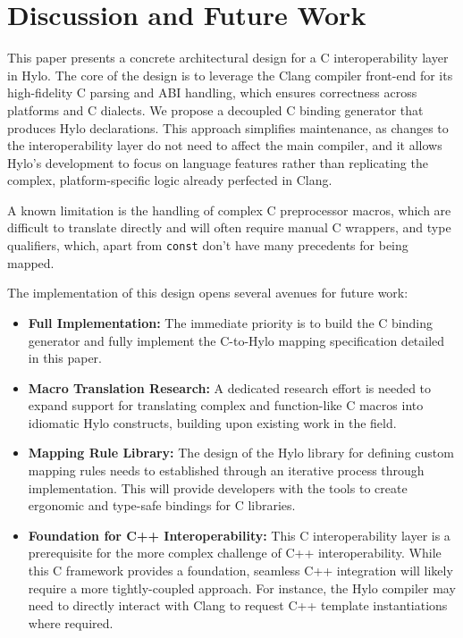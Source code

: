 \section{Discussion and Future Work}
\label{sec:discussion}

This paper presents a concrete architectural design for a C interoperability layer in Hylo. The core of the design is to leverage the Clang compiler front-end for its high-fidelity C parsing and ABI handling, which ensures correctness across platforms and C dialects. We propose a decoupled C binding generator that produces Hylo declarations. This approach simplifies maintenance, as changes to the interoperability layer do not need to affect the main compiler, and it allows Hylo's development to focus on language features rather than replicating the complex, platform-specific logic already perfected in Clang.

A known limitation is the handling of complex C preprocessor macros, which are difficult to translate directly and will often require manual C wrappers, and type qualifiers, which, apart from \texttt{const} don't have many precedents for being mapped.

The implementation of this design opens several avenues for future work:
\begin{itemize}
    \item \textbf{Full Implementation:} The immediate priority is to build the C binding generator and fully implement the C-to-Hylo mapping specification detailed in this paper.
    \item \textbf{Macro Translation Research:} A dedicated research effort is needed to expand support for translating complex and function-like C macros into idiomatic Hylo constructs, building upon existing work in the field.
    \item \textbf{Mapping Rule Library:} The design of the Hylo library for defining custom mapping rules needs to established through an iterative process through implementation. This will provide developers with the tools to create ergonomic and type-safe bindings for C libraries.
    \item \textbf{Foundation for C++ Interoperability:} This C interoperability layer is a prerequisite for the more complex challenge of C++ interoperability. While this C framework provides a foundation, seamless C++ integration will likely require a more tightly-coupled approach. For instance, the Hylo compiler may need to directly interact with Clang to request C++ template instantiations where required.
\end{itemize}

